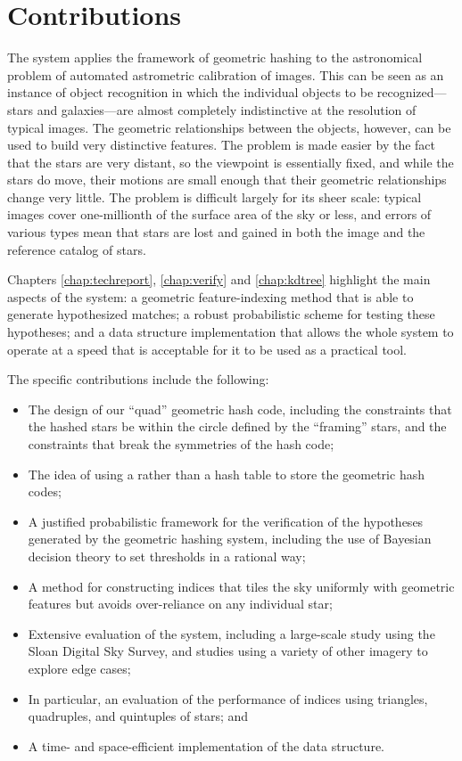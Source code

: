 

\section{Contributions}

The \an system applies the framework of geometric hashing to the
astronomical problem of automated astrometric calibration of images.  This
can be seen as an instance of object recognition in which the
individual objects to be recognized---stars and galaxies---are almost
completely indistinctive at the resolution of typical images.  The
geometric relationships between the objects, however, can be used to
build very distinctive features.  The problem is made easier by the
fact that the stars are very distant, so the viewpoint is essentially
fixed, and while the stars do move, their motions are small enough
that their geometric relationships change very little.  The problem is
difficult largely for its sheer scale: typical images cover
one-millionth of the surface area of the sky or less, and errors of
various types mean that stars are lost and gained in both the image
and the reference catalog of stars.


Chapters \ref{chap:techreport}, \ref{chap:verify} and
\ref{chap:kdtree} highlight the main aspects of the system: a
geometric feature-indexing method that is able to generate
hypothesized matches; a robust probabilistic scheme for testing these
hypotheses; and a data structure implementation that allows the whole
system to operate at a speed that is acceptable for it to be used as a
practical tool.


The specific contributions include the following:
\nonumberparagraphs
\begin{itemize}
\item The design of our
``quad'' geometric hash code, including the constraints that the
hashed stars be within the circle defined by the ``framing'' stars,
and the constraints that break the symmetries of the hash code;
\item The idea of using a \kdtree rather than a hash table to
store the geometric hash codes;
\item A justified probabilistic framework for the verification of
the hypotheses generated by the geometric hashing system, including
the use of Bayesian decision theory to set thresholds in a rational
way;
\item A method for constructing indices that tiles the sky uniformly
with geometric features but avoids over-reliance on any individual
star;
\item Extensive evaluation of the \an system, including a large-scale study using
the Sloan Digital Sky Survey, and studies using a variety of other
imagery to explore edge cases;
\item In particular, an evaluation of the performance of indices using
triangles, quadruples, and quintuples of stars; and
\item A time- and space-efficient implementation of the \kdtree data structure.
\end{itemize}
\numberparagraphs


